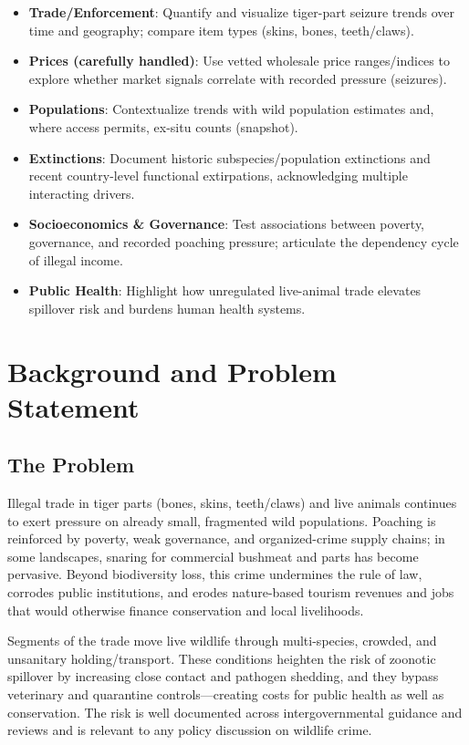 \documentclass[
]{article}
\begin{document}
\begin{itemize}
\item
  \textbf{Trade/Enforcement}: Quantify and visualize tiger-part seizure
  trends over time and geography; compare item types (skins, bones,
  teeth/claws).
\item
  \textbf{Prices (carefully handled)}: Use vetted wholesale price
  ranges/indices to explore whether market signals correlate with
  recorded pressure (seizures).
\item
  \textbf{Populations}: Contextualize trends with wild population
  estimates and, where access permits, ex-situ counts (snapshot).
\item
  \textbf{Extinctions}: Document historic subspecies/population
  extinctions and recent country-level functional extirpations,
  acknowledging multiple interacting drivers.
\item
  \textbf{Socioeconomics \& Governance}: Test associations between
  poverty, governance, and recorded poaching pressure; articulate the
  dependency cycle of illegal income.
\item
  \textbf{Public Health}: Highlight how unregulated live-animal trade
  elevates spillover risk and burdens human health systems.
\end{itemize}

\section{Background and Problem
Statement}\label{background-and-problem-statement}

\subsection{The Problem}\label{the-problem}

Illegal trade in tiger parts (bones, skins, teeth/claws) and live
animals continues to exert pressure on already small, fragmented wild
populations. Poaching is reinforced by poverty, weak governance, and
organized-crime supply chains; in some landscapes, snaring for
commercial bushmeat and parts has become pervasive. Beyond biodiversity
loss, this crime undermines the rule of law, corrodes public
institutions, and erodes nature-based tourism revenues and jobs that
would otherwise finance conservation and local livelihoods.

Segments of the trade move live wildlife through multi-species, crowded,
and unsanitary holding/transport. These conditions heighten the risk of
zoonotic spillover by increasing close contact and pathogen shedding,
and they bypass veterinary and quarantine controls---creating costs for
public health as well as conservation. The risk is well documented
across intergovernmental guidance and reviews and is relevant to any
policy discussion on wildlife crime.
\end{document}
